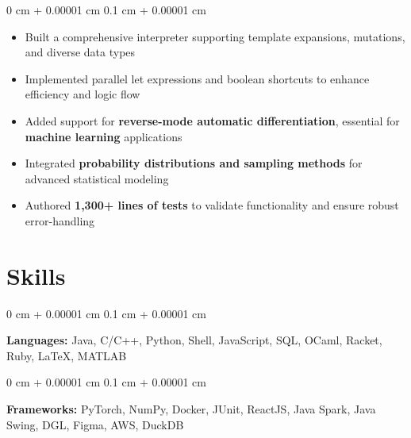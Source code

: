 \documentclass[10pt, letterpaper]{article}
\newenvironment{highlights}{
    \begin{itemize}[
        topsep=0.1 cm,
        parsep=0.10 cm,
        partopsep=0pt,
        itemsep=0pt,
        leftmargin=0.4 cm + 10pt
    ]
}{
    \end{itemize}
} %
\newenvironment{onecolentry}{
    \begin{adjustwidth}{
        0 cm + 0.00001 cm
    }{
        0.1 cm + 0.00001 cm
    }
}{
    \end{adjustwidth}
} %
\begin{document}
        \vspace{0.10 cm}
        \begin{onecolentry}
            \begin{highlights}
\item Built a comprehensive interpreter supporting template expansions, mutations, and diverse data types
\item Implemented parallel let expressions and boolean shortcuts to enhance efficiency and logic flow
\item Added support for \textbf{reverse-mode automatic differentiation}, essential for \textbf{machine learning} applications
\item Integrated \textbf{probability distributions and sampling methods} for advanced statistical modeling
\item Authored \textbf{1,300+ lines of tests} to validate functionality and ensure robust error-handling
            \end{highlights}
        \end{onecolentry}


        



    
    \section{Skills}

        
        \begin{onecolentry}
            \textbf{Languages:} Java, C/C++, Python, Shell, JavaScript, SQL, OCaml, Racket, Ruby, LaTeX, MATLAB
        \end{onecolentry}

        \vspace{0.2 cm}

        \begin{onecolentry}
            \textbf{Frameworks:} PyTorch, NumPy, Docker, JUnit, ReactJS, Java Spark, Java Swing, DGL, Figma, AWS, DuckDB
        \end{onecolentry}
\end{document}
